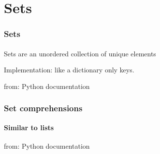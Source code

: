 \section{Sets} %
\label{sec:sets}

\begin{frame}\frametitle{Sets}
    \framesubtitle{}

    Sets are an unordered collection of unique elements


    Implementation: like a dictionary only keys.

    \tiny{from: Python documentation}

\end{frame}

\begin{frame}\frametitle{Set comprehensions}
    \framesubtitle{Similar to lists}


    \tiny{from: Python documentation}

\end{frame}
